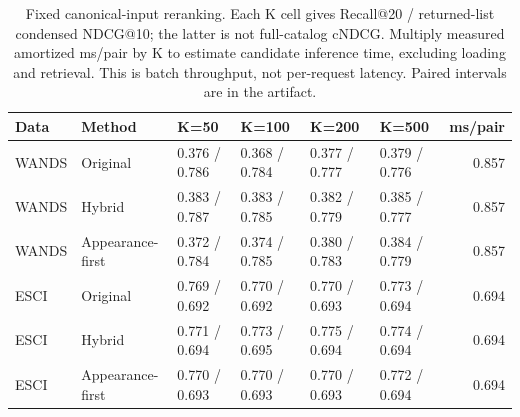 \begin{table}[tp]
\caption{Fixed canonical-input reranking. Each K cell gives Recall@20 / returned-list condensed NDCG@10; the latter is not full-catalog cNDCG. Multiply measured amortized ms/pair by K to estimate candidate inference time, excluding loading and retrieval. This is batch throughput, not per-request latency. Paired intervals are in the artifact.}\label{tab:rerankdetail}
\centering\small
\begin{tabular}{llllllr}\toprule
Data & Method & K=50 & K=100 & K=200 & K=500 & ms/pair\\\midrule
WANDS & Original & 0.376 / 0.786 & 0.368 / 0.784 & 0.377 / 0.777 & 0.379 / 0.776 & 0.857\\
WANDS & Hybrid & 0.383 / 0.787 & 0.383 / 0.785 & 0.382 / 0.779 & 0.385 / 0.777 & 0.857\\
WANDS & Appearance-first & 0.372 / 0.784 & 0.374 / 0.785 & 0.380 / 0.783 & 0.384 / 0.779 & 0.857\\
ESCI & Original & 0.769 / 0.692 & 0.770 / 0.692 & 0.770 / 0.693 & 0.773 / 0.694 & 0.694\\
ESCI & Hybrid & 0.771 / 0.694 & 0.773 / 0.695 & 0.775 / 0.694 & 0.774 / 0.694 & 0.694\\
ESCI & Appearance-first & 0.770 / 0.693 & 0.770 / 0.693 & 0.770 / 0.693 & 0.772 / 0.694 & 0.694\\
\bottomrule\end{tabular}
\end{table}

